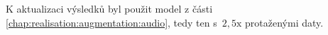 K aktualizaci výsledků byl použit
model z části \ref{chap:realisation:augmentation:audio}, tedy ten s~$2,5\mathrm{x}$ protaženými daty.




